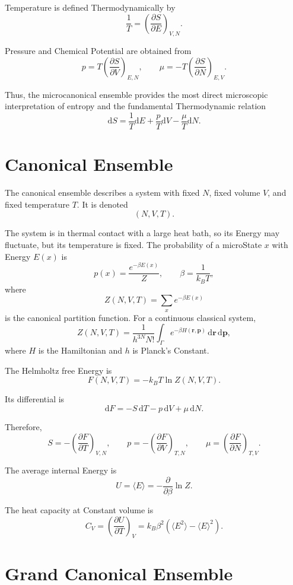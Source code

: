 \documentclass[a4paper, 10pt, onepage]{elegantbook}
\begin{document}
{Temperature is defined Thermodynamically by
\[
\frac{1}{T}
=
\left(\frac{\partial S}{\partial E}\right)_{V,N}.
\]

Pressure and Chemical Potential are obtained from
\[
p
=
T\left(\frac{\partial S}{\partial V}\right)_{E,N},
\qquad
\mu
=
-T\left(\frac{\partial S}{\partial N}\right)_{E,V}.
\]

Thus, the microcanonical ensemble provides the most direct microscopic
interpretation of entropy and the fundamental Thermodynamic relation
\[
\mathrm dS
=
\frac{1}{T}\mathrm dE
+
\frac{p}{T}\mathrm dV
-
\frac{\mu}{T}\mathrm dN.
\]

\section{Canonical Ensemble}

The canonical ensemble describes a system with fixed \(N\), fixed volume \(V\),
and fixed temperature \(T\). It is denoted
\[
(N,V,T).
\]

The system is in thermal contact with a large heat bath, so its Energy may
fluctuate, but its temperature is fixed. The probability of a microState \(x\)
with Energy \(E(x)\) is
\[
p(x)
=
\frac{e^{-\beta E(x)}}{Z},
\qquad
\beta=\frac{1}{k_BT},
\]
where
\[
Z(N,V,T)
=
\sum_x e^{-\beta E(x)}
\]
is the canonical partition function. For a continuous classical system,
\[
Z(N,V,T)
=
\frac{1}{h^{3N}N!}
\int_{\Gamma}
e^{-\beta H(\mathbf r,\mathbf p)}
\,\mathrm d\mathbf r\,\mathrm d\mathbf p,
\]
where \(H\) is the Hamiltonian and \(h\) is Planck's Constant.

The Helmholtz free Energy is
\[
F(N,V,T)
=
-k_BT\ln Z(N,V,T).
\]

Its differential is
\[
\mathrm dF
=
-S\,\mathrm dT
-p\,\mathrm dV
+\mu\,\mathrm dN.
\]

Therefore,
\[
S=-\left(\frac{\partial F}{\partial T}\right)_{V,N},
\qquad
p=-\left(\frac{\partial F}{\partial V}\right)_{T,N},
\qquad
\mu=\left(\frac{\partial F}{\partial N}\right)_{T,V}.
\]

The average internal Energy is
\[
U=\langle E\rangle
=
-\frac{\partial}{\partial\beta}\ln Z.
\]

The heat capacity at Constant volume is
\[
C_V
=
\left(\frac{\partial U}{\partial T}\right)_V
=
k_B\beta^2
\left(
\langle E^2\rangle-\langle E\rangle^2
\right).
\]

\section{Grand Canonical Ensemble}

}
\end{document}
